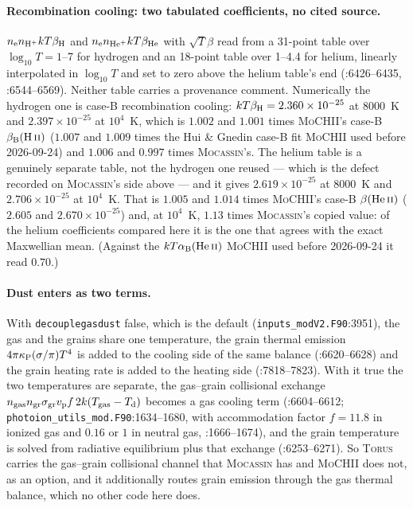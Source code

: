 \documentclass[english,a4paper]{my_memo}
\newcommand{\code}[1]{\texttt{#1}}
\newcommand{\MoCHII}{\textsc{MoCHII}}
\newcommand{\Mocassin}{\textsc{Mocassin}}
\newcommand{\Torus}{\textsc{Torus}}
\newcommand{\nel}{n_{\rm e}}
\begin{document}
\paragraph{Recombination cooling: two tabulated coefficients, no cited source.}
$\nel n_{\rm H^+}kT\beta_{\rm H}$ and $\nel n_{\rm He^+}kT\beta_{\rm He}$ with
$\sqrt{T}\beta$ read from a 31-point table over $\log_{10}T = 1$--7 for
hydrogen and an 18-point table over 1--4.4 for helium, linearly interpolated in
$\log_{10}T$ and set to zero above the helium table's end (:6426--6435,
:6544--6569).  Neither table carries a provenance comment.  Numerically the
hydrogen one is case-B recombination cooling: $kT\beta_{\rm H} =
2.360\times10^{-25}$ at 8000~K and $2.397\times10^{-25}$ at $10^4$~K, which is
$1.002$ and $1.001$ times \MoCHII{}'s case-B $\beta_{\rm B}({\rm
H\,\textsc{ii}})$ ($1.007$ and $1.009$ times the Hui \& Gnedin case-B fit
\MoCHII{} used before 2026-09-24) and $1.006$ and $0.997$ times \Mocassin{}'s.
The helium table is a genuinely separate table, not the hydrogen one reused
--- which is the defect recorded on \Mocassin{}'s side above --- and it gives
$2.619\times10^{-25}$ at 8000~K and $2.706\times10^{-25}$ at $10^4$~K.  That
is $1.005$ and $1.014$ times \MoCHII{}'s case-B $\beta({\rm He\,\textsc{ii}})$
($2.605$ and $2.670\times10^{-25}$) and, at $10^4$~K, $1.13$ times
\Mocassin{}'s copied value: of the helium coefficients compared here it is the
one that agrees with the exact Maxwellian mean.  (Against the
$kT\alpha_{\rm B}({\rm He\,\textsc{ii}})$ \MoCHII{} used before 2026-09-24 it
read $0.70$.)

\paragraph{Dust enters as two terms.}  With
\code{decouplegasdust} false, which is the default
(\code{inputs\_modV2.F90}:3951), the gas and the grains share one temperature,
the grain thermal emission $4\pi\kappa_{\rm P}(\sigma/\pi)T^4$ is added to the
cooling side of the same balance (:6620--6628) and the grain heating rate is
added to the heating side (:7818--7823).  With it true the two temperatures are
separate, the gas--grain collisional exchange
$n_{\rm gas}n_{\rm gr}\sigma_{\rm gr}v_{\rm p}f\,2k(T_{\rm gas}-T_{\rm d})$
becomes a gas cooling term (:6604--6612;
\code{photoion\_utils\_mod.F90}:1634--1680, with accommodation factor
$f = 11.8$ in ionized gas and $0.16$ or $1$ in neutral gas, :1666--1674), and
the grain temperature is solved from radiative equilibrium plus that exchange
(:6253--6271).  So \Torus{} carries the gas--grain collisional channel that
\Mocassin{} has and \MoCHII{} does not, as an option, and it additionally
routes grain emission through the gas thermal balance, which no other code
here does.
\end{document}
